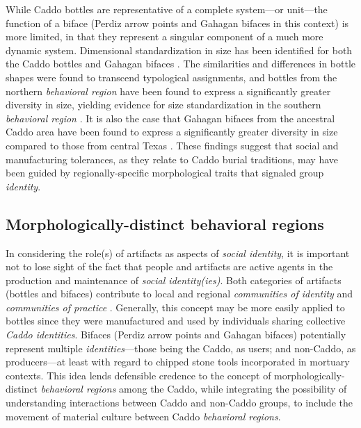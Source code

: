\documentclass[smallextended]{svjour3}       %
\begin{document}
While Caddo bottles are representative of a complete system---or
unit---the function of a biface (Perdiz arrow points and Gahagan bifaces
in this context) is more limited, in that they represent a singular
component of a much more dynamic system. Dimensional standardization in
size has been identified for both the Caddo bottles and Gahagan bifaces
\cite{RN8074,RN7927,RN8370,RN8312,RN8322}. The similarities and
differences in bottle shapes were found to transcend typological
assignments, and bottles from the northern \emph{behavioral region} have
been found to express a significantly greater diversity in size,
yielding evidence for size standardization in the southern
\emph{behavioral region} \cite{RN8312}. It is also the case that Gahagan
bifaces from the ancestral Caddo area have been found to express a
significantly greater diversity in size compared to those from central
Texas \cite{RN8322}. These findings suggest that social and
manufacturing tolerances, as they relate to Caddo burial traditions, may
have been guided by regionally-specific morphological traits that
signaled group \emph{identity}.

\hypertarget{morphologically-distinct-behavioral-regions}{%
\subsection{Morphologically-distinct behavioral
regions}\label{morphologically-distinct-behavioral-regions}}

In considering the role(s) of artifacts as aspects of \emph{social
identity}, it is important not to lose sight of the fact that people and
artifacts are active agents in the production and maintenance of
\emph{social identity(ies)}. Both categories of artifacts (bottles and
bifaces) contribute to local and regional \emph{communities of identity}
and \emph{communities of practice} \cite{RN8061}. Generally, this
concept may be more easily applied to bottles since they were
manufactured and used by individuals sharing collective \emph{Caddo
identities}. Bifaces (Perdiz arrow points and Gahagan bifaces)
potentially represent multiple \emph{identities}---those being the
Caddo, as users; and non-Caddo, as producers---at least with regard to
chipped stone tools incorporated in mortuary contexts. This idea lends
defensible credence to the concept of morphologically-distinct
\emph{behavioral regions} among the Caddo, while integrating the
possibility of understanding interactions between Caddo and non-Caddo
groups, to include the movement of material culture between Caddo
\emph{behavioral regions}.
\end{document}
